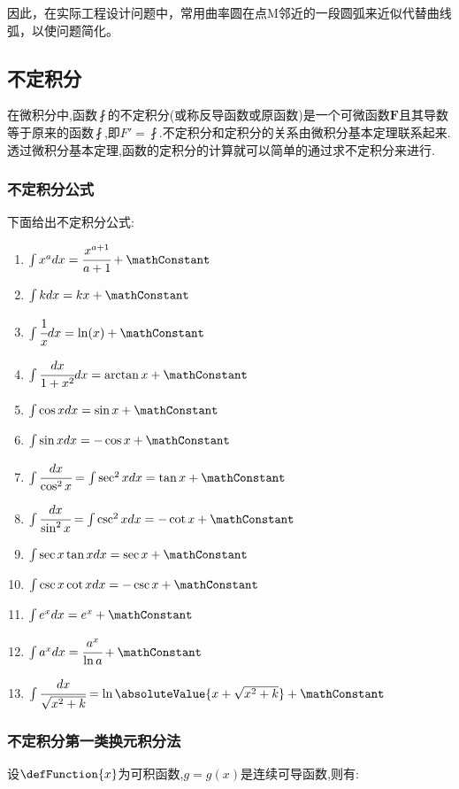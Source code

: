 {{{  因此，在实际工程设计问题中，常用曲率圆在点M邻近的一段圆弧来近似代替曲线弧，以使问题简化。
}%

}%

\subsection{不定积分}{
  在微积分中,函数$\fint$的不定积分(或称反导函数或原函数)是一个可微函数$\mathbf{F}$且其导数等于原来的函数$\fint$,即$F\prime = \fint$.不定积分和定积分的关系由微积分基本定理联系起来.透过微积分基本定理,函数的定积分的计算就可以简单的通过求不定积分来进行.

  \subsubsection{不定积分公式}{
    下面给出不定积分公式:

    \begin{enumerate}
      \item $\int x^adx = \cfrac{x^{a+1}}{a+1} + \mathConstant$
      \item $\int kdx = kx + \mathConstant$
      \item $\int \cfrac{1}{x}dx = \ln(x) + \mathConstant$
      \item $\int \cfrac{dx}{1+x^2}dx = \arctan x + \mathConstant$
      \item $\int \cos xdx = \sin x + \mathConstant$
      \item $\int \sin xdx = -\cos x + \mathConstant$
      \item $\int \cfrac{dx}{\cos^2x} = \int \sec^2xdx = \tan x + \mathConstant$
      \item $\int \cfrac{dx}{\sin^2x} = \int\csc^2xdx = -\cot x + \mathConstant$
      \item $\int \sec x\tan xdx = \sec x + \mathConstant$
      \item $\int \csc x\cot xdx = -\csc x + \mathConstant$
      \item $\int e^xdx = e^x + \mathConstant$
      \item $\int a^xdx = \cfrac{a^x}{\ln a} + \mathConstant$
      \item $\int \cfrac{dx}{\sqrt{x^2 + k}} = \ln\absoluteValue{x + \sqrt{x^2 + k}} + \mathConstant$
    \end{enumerate}

  }%

  \subsubsection{不定积分第一类换元积分法}{
    设$\defFunction{x}$为可积函数,$g = g(x)$是连续可导函数,则有:

}}}
